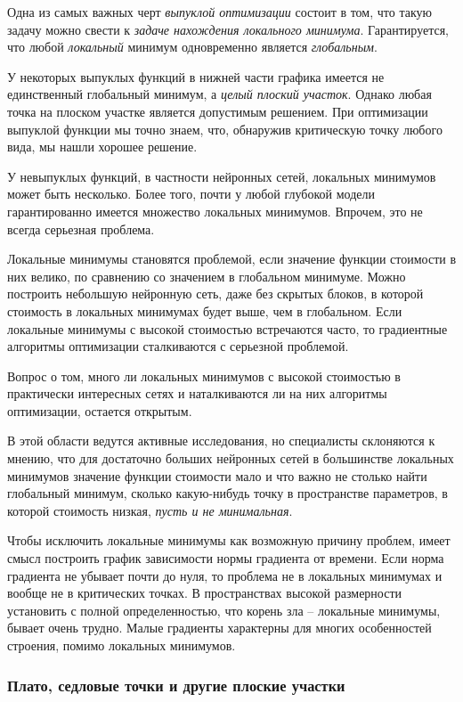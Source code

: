 \documentclass[%
	11pt,
	a4paper,
	utf8,
]{article}
\begin{document}
Одна из самых важных черт \emph{выпуклой оптимизации} состоит в том, что такую задачу можно свести к \emph{задаче нахождения локального минимума}. Гарантируется, что любой \emph{локальный} минимум одновременно является \emph{глобальным}.

У некоторых выпуклых функций в нижней части графика имеется не единственный глобальный минимум, а \emph{целый плоский участок}. Однако любая точка на плоском участке является допустимым решением. При оптимизации выпуклой функции мы точно знаем, что, обнаружив критическую точку любого вида, мы нашли хорошее решение.

У невыпуклых функций, в частности нейронных сетей, локальных минимумов может быть несколько. Более того, почти у любой глубокой модели гарантированно имеется множество локальных минимумов. Впрочем, это не всегда серьезная проблема.

Локальные минимумы становятся проблемой, если значение функции стоимости в них велико, по сравнению со значением в глобальном минимуме. Можно построить небольшую нейронную сеть, даже без скрытых блоков, в которой стоимость в локальных минимумах будет выше, чем в глобальном. Если локальные минимумы с высокой стоимостью встречаются часто, то градиентные алгоритмы оптимизации сталкиваются с серьезной проблемой.

Вопрос о том, много ли локальных минимумов с высокой стоимостью в практически интересных сетях и наталкиваются ли на них алгоритмы оптимизации, остается открытым. 

В этой области ведутся активные исследования, но специалисты склоняются к мнению, что для достаточно больших нейронных сетей в большинстве локальных минимумов значение функции стоимости мало и что {\color{blue}важно не столько найти глобальный минимум, сколько какую-нибудь точку в пространстве параметров, в которой стоимость низкая, \emph{пусть и не минимальная}.}

Чтобы исключить локальные минимумы как возможную причину проблем, имеет смысл построить график зависимости нормы градиента от времени. Если норма градиента не убывает почти до нуля, то проблема не в локальных минимумах и вообще не в критических точках. В пространствах высокой размерности установить с полной определенностью, что корень зла -- локальные минимумы, бывает очень трудно. Малые градиенты характерны для многих особенностей строения, помимо локальных минимумов.

\subsubsection{Плато, седловые точки и другие плоские участки}
\end{document}
